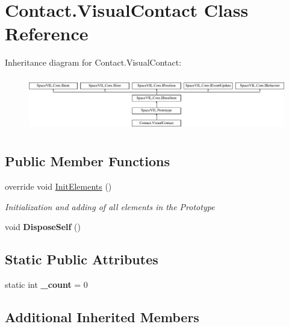\hypertarget{class_contact_1_1_visual_contact}{}\section{Contact.\+Visual\+Contact Class Reference}
\label{class_contact_1_1_visual_contact}
Inheritance diagram for Contact.\+Visual\+Contact\+:\begin{figure}[H]
\begin{center}
\leavevmode
\includegraphics[height=2.421622cm]{class_contact_1_1_visual_contact}
\end{center}
\end{figure}
\subsection*{Public Member Functions}
\begin{DoxyCompactItemize}
\item 
override void \mbox{\hyperlink{class_contact_1_1_visual_contact_a975573507e5e287632273df844dc7792}{Init\+Elements}} ()
\begin{DoxyCompactList}\small\item\em Initialization and adding of all elements in the Prototype \end{DoxyCompactList}\item 
\mbox{\label{class_contact_1_1_visual_contact_a0ec8e14053a40eda5a15ec7bc30bc95e}} 
void {\bfseries Dispose\+Self} ()
\end{DoxyCompactItemize}
\subsection*{Static Public Attributes}
\begin{DoxyCompactItemize}
\item 
\mbox{\label{class_contact_1_1_visual_contact_aa0678f48d80f3e1698b62a87c767177a}} 
static int {\bfseries \+\_\+count} = 0
\end{DoxyCompactItemize}
\subsection*{Additional Inherited Members}


